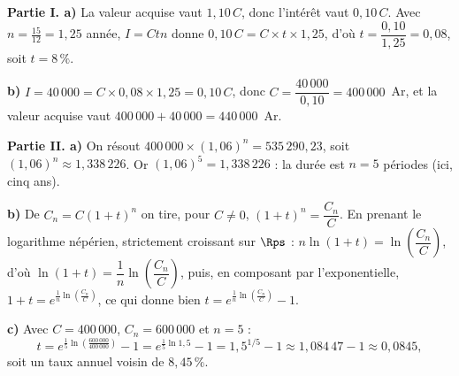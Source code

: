 \begin{corrige}[annales]
\textbf{Partie I. a)} La valeur acquise vaut $1{,}10\,C$, donc l'intérêt
vaut $0{,}10\,C$. Avec $n = \frac{15}{12} = 1{,}25$ année,
$I = Ctn$ donne $0{,}10\,C = C \times t \times 1{,}25$, d'où
$t = \dfrac{0{,}10}{1{,}25} = 0{,}08$, soit $t = 8\,\%$.

\textbf{b)} $I = 40\,000 = C \times 0{,}08 \times 1{,}25 = 0{,}10\,C$, donc
$C = \dfrac{40\,000}{0{,}10} = 400\,000$~Ar, et la valeur acquise vaut
$400\,000+40\,000 = 440\,000$~Ar.

\textbf{Partie II. a)} On résout $400\,000 \times (1{,}06)^{n}
= 535\,290{,}23$, soit $(1{,}06)^{n} \approx 1{,}338\,226$. Or
$(1{,}06)^{5} = 1{,}338\,226$ : la durée est $n = 5$ périodes (ici, cinq
ans).

\textbf{b)} De $C_{n} = C(1+t)^{n}$ on tire, pour $C \neq 0$,
$(1+t)^{n} = \dfrac{C_{n}}{C}$. En prenant le logarithme népérien, strictement
croissant sur $\Rps$ :
$n\ln(1+t) = \ln\!\left(\dfrac{C_{n}}{C}\right)$, d'où
$\ln(1+t) = \dfrac1n\ln\!\left(\dfrac{C_{n}}{C}\right)$, puis, en composant
par l'exponentielle,
$1+t = e^{\frac1n\ln\left(\frac{C_{n}}{C}\right)}$, ce qui donne bien
$t = e^{\frac1n\ln\left(\frac{C_{n}}{C}\right)}-1$.

\textbf{c)} Avec $C = 400\,000$, $C_{n} = 600\,000$ et $n = 5$ :
\[
  t = e^{\frac15\ln\left(\frac{600\,000}{400\,000}\right)}-1
  = e^{\frac15\ln1{,}5}-1
  = 1{,}5^{1/5}-1 \approx 1{,}084\,47-1 \approx 0{,}0845,
\]
soit un taux annuel voisin de $8{,}45\,\%$.
\end{corrige}

